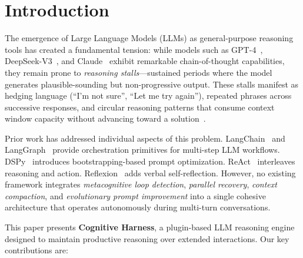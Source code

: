 \documentclass[conference]{IEEEtran}
\begin{document}
\section{Introduction}
\label{sec:intro}

The emergence of Large Language Models (LLMs) as general-purpose reasoning tools has created a fundamental tension: while models such as GPT-4~\cite{achiam2023gpt4}, DeepSeek-V3~\cite{deepseekai2024deepseekv3}, and Claude~\cite{anthropic2024claude} exhibit remarkable chain-of-thought capabilities, they remain prone to \emph{reasoning stalls}---sustained periods where the model generates plausible-sounding but non-progressive output. These stalls manifest as hedging language (``I'm not sure'', ``Let me try again''), repeated phrases across successive responses, and circular reasoning patterns that consume context window capacity without advancing toward a solution~\cite{wei2022chain}.

Prior work has addressed individual aspects of this problem. LangChain~\cite{langchain2023} and LangGraph~\cite{langgraph2024} provide orchestration primitives for multi-step LLM workflows. DSPy~\cite{khattab2023dspy} introduces bootstrapping-based prompt optimization. ReAct~\cite{yao2023react} interleaves reasoning and action. Reflexion~\cite{shinn2023reflexion} adds verbal self-reflection. However, no existing framework integrates \emph{metacognitive loop detection}, \emph{parallel recovery}, \emph{context compaction}, and \emph{evolutionary prompt improvement} into a single cohesive architecture that operates autonomously during multi-turn conversations.

This paper presents \textbf{Cognitive Harness}, a plugin-based LLM reasoning engine designed to maintain productive reasoning over extended interactions. Our key contributions are:
\end{document}
